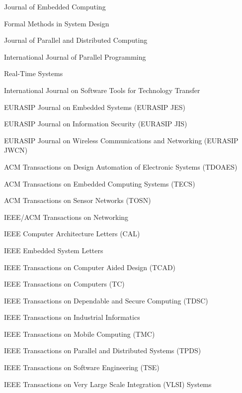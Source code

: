 \documentclass[final,conference,10pt]{IEEEtran}
\begin{document}
Journal of Embedded Computing

Formal Methods in System Design

Journal of Parallel and Distributed Computing

International Journal of Parallel Programming

Real-Time Systems

International Journal on Software Tools for Technology Transfer

EURASIP Journal on Embedded Systems (EURASIP JES)

EURASIP Journal on Information Security (EURASIP JIS)

EURASIP Journal on Wireless Communications and Networking (EURASIP JWCN)

ACM Transactions on Design Automation of Electronic Systems (TDOAES)

ACM Transactions on Embedded Computing Systems (TECS)

ACM Transactions on Sensor Networks (TOSN)

IEEE/ACM Transactions on Networking

IEEE Computer Architecture Letters (CAL)

IEEE Embedded System Letters

IEEE Transactions on Computer Aided Design (TCAD)

IEEE Transactions on Computers (TC)

IEEE Transactions on Dependable and Secure Computing (TDSC)

IEEE Transactions on Industrial Informatics

IEEE Transactions on Mobile Computing (TMC)

IEEE Transactions on Parallel and Distributed Systems (TPDS)

IEEE Transactions on Software Engineering (TSE)

IEEE Transactions on Very Large Scale Integration (VLSI) Systems
\end{document}
